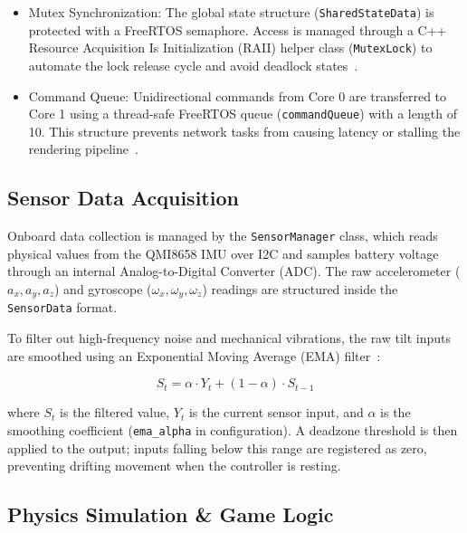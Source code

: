 \documentclass[10pt,journal,final,a4paper]{IEEEtran}
\begin{document}
\begin{itemize}
    \item Mutex Synchronization: The global state structure (\texttt{SharedStateData}) is protected with a FreeRTOS semaphore. Access is managed through a C++ Resource Acquisition Is Initialization (RAII) helper class (\texttt{MutexLock}) to automate the lock release cycle and avoid deadlock states~\cite{cppreference2026raii}.
    \item Command Queue: Unidirectional commands from Core 0 are transferred to Core 1 using a thread-safe FreeRTOS queue (\texttt{commandQueue}) with a length of 10. This structure prevents network tasks from causing latency or stalling the rendering pipeline~\cite{freertos2026esp32}.
\end{itemize}

\subsection{Sensor Data Acquisition}
\label{subsec:sensor_data_acquisition}

Onboard data collection is managed by the \texttt{SensorManager} class, which reads physical values from the QMI8658 IMU over I2C and samples battery voltage through an internal Analog-to-Digital Converter (ADC). The raw accelerometer ($a_x, a_y, a_z$) and gyroscope ($\omega_x, \omega_y, \omega_z$) readings are structured inside the \texttt{SensorData} format.

To filter out high-frequency noise and mechanical vibrations, the raw tilt inputs are smoothed using an Exponential Moving Average (EMA) filter~\cite{klinker2011exponential}:

\begin{equation}
    S_t = \alpha \cdot Y_t + (1 - \alpha) \cdot S_{t-1}
\end{equation}

where $S_t$ is the filtered value, $Y_t$ is the current sensor input, and $\alpha$ is the smoothing coefficient (\texttt{ema\_alpha} in configuration).
A deadzone threshold is then applied to the output; inputs falling below this range are registered as zero, preventing drifting movement when the controller is resting.

\subsection{Physics Simulation \& Game Logic}
\label{subsec:physics_simulation_game_logic}
\end{document}
